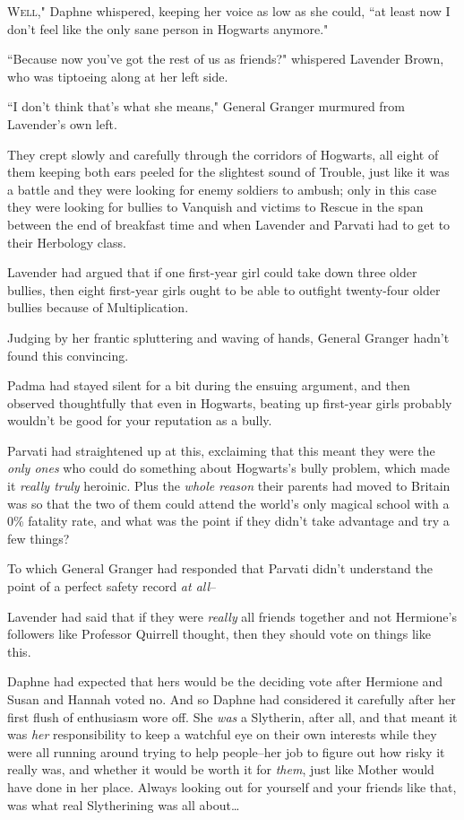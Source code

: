 
\lettrine[ante=``]{W}{ell,"} Daphne whispered, keeping her voice as low as she could, ``at least now I don't feel like the only sane person in Hogwarts anymore."

``Because now you've got the rest of us as friends?" whispered Lavender Brown, who was tiptoeing along at her left side.

``I don't think that's what she means," General Granger murmured from Lavender's own left.

They crept slowly and carefully through the corridors of Hogwarts, all eight of them keeping both ears peeled for the slightest sound of Trouble, just like it was a battle and they were looking for enemy soldiers to ambush; only in this case they were looking for bullies to Vanquish and victims to Rescue in the span between the end of breakfast time and when Lavender and Parvati had to get to their Herbology class.

Lavender had argued that if one first-year girl could take down three older bullies, then eight first-year girls ought to be able to outfight twenty-four older bullies because of Multiplication.

Judging by her frantic spluttering and waving of hands, General Granger hadn't found this convincing.

Padma had stayed silent for a bit during the ensuing argument, and then observed thoughtfully that even in Hogwarts, beating up first-year girls probably wouldn't be good for your reputation as a bully.

Parvati had straightened up at this, exclaiming that this meant they were the \emph{only ones} who could do something about Hogwarts's bully problem, which made it \emph{really truly} heroinic. Plus the \emph{whole reason} their parents had moved to Britain was so that the two of them could attend the world's only magical school with a 0\% fatality rate, and what was the point if they didn't take advantage and try a few things?

To which General Granger had responded that Parvati didn't understand the point of a perfect safety record \emph{at all}\---

Lavender had said that if they were \emph{really} all friends together and not Hermione's followers like Professor Quirrell thought, then they should vote on things like this.

Daphne had expected that hers would be the deciding vote after Hermione and Susan and Hannah voted no. And so Daphne had considered it carefully after her first flush of enthusiasm wore off. She \emph{was} a Slytherin, after all, and that meant it was \emph{her} responsibility to keep a watchful eye on their own interests while they were all running around trying to help people\---her job to figure out how risky it really was, and whether it would be worth it for \emph{them}, just like Mother would have done in her place. Always looking out for yourself and your friends like that, was what real Slytherining was all about{\ldots}

